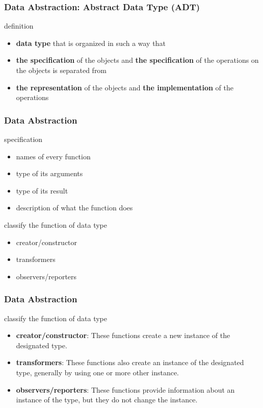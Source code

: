 \documentclass[newPxFont,sthlmFooter,nooffset]{beamer}
\begin{document}
\begin{frame}[t]
  \frametitle{Data Abstraction: Abstract Data Type (ADT)}
definition
\begin{itemize}
\item \textbf{data type} that is organized in such a way that
\item \textbf{the specification} of the objects and \textbf{the specification} of the operations on the objects is separated from
\item  \textbf{the representation} of the objects and \textbf{the implementation} of the operations
\end{itemize}


\end{frame}

\begin{frame}[t]
  \frametitle{Data Abstraction}
specification
\begin{itemize}
\item  names of every function
\item type of its arguments
\item type of its result
\item description of what the function does
\end{itemize}

classify the function of data type 
\begin{itemize}
\item creator/constructor
\item transformers
\item observers/reporters
\end{itemize}
\end{frame}

\begin{frame}[t]
	\frametitle{Data Abstraction}
	classify the function of data type 
	\begin{itemize}
		\item\textbf{creator/constructor}: These functions create a new instance of the designated type.
		\item\textbf{transformers}: These functions also create an instance of the designated type, generally by using one or more other instance.
		\item\textbf{observers/reporters}: These functions provide information about an instance of the type, but they do not change the instance.
	\end{itemize}
	
\end{frame}
\end{document}
